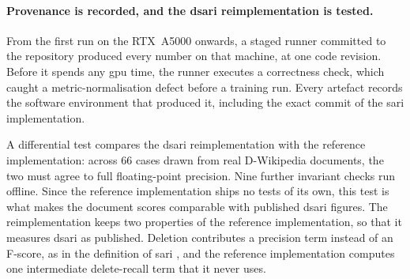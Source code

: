 \paragraph{Provenance is recorded, and the \gls{dsari} reimplementation is tested.}
From the first run on the RTX~A5000 onwards, a staged runner committed to the repository produced every number on that machine, at one code revision.
Before it spends any \gls{gpu} time, the runner executes a correctness check, which caught a metric-normalisation defect before a training run.
Every artefact records the software environment that produced it, including the exact commit of the \gls{sari} implementation.

A differential test compares the \gls{dsari} reimplementation with the reference implementation: across 66 cases drawn from real D-Wikipedia documents, the two must agree to full floating-point precision.
Nine further invariant checks run offline.
Since the reference implementation ships no tests of its own, this test is what makes the document scores comparable with published \gls{dsari} figures.
The reimplementation keeps two properties of the reference implementation, so that it measures \gls{dsari} as published.
Deletion contributes a precision term instead of an F-score, as in the definition of \gls{sari} \parencite[405]{xu-etal-2016-optimizing}, and the reference implementation computes one intermediate delete-recall term that it never uses.
